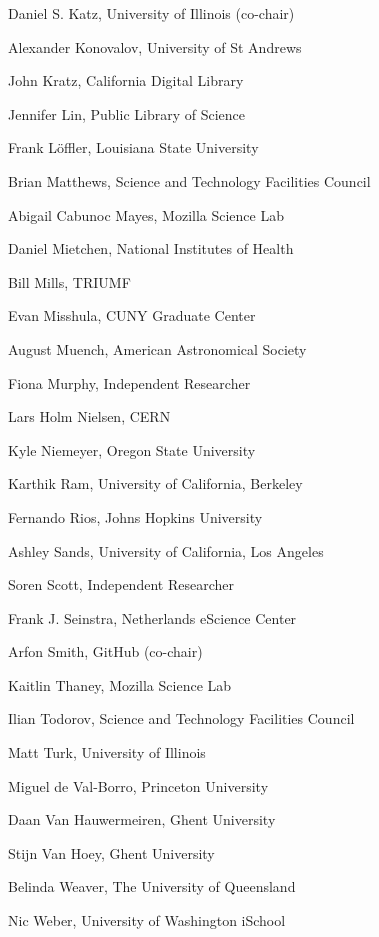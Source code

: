 \documentclass[11pt, oneside]{amsart}
\begin{document}
Daniel S. Katz, University of Illinois (co-chair)

Alexander Konovalov, University of St Andrews

John Kratz, California Digital Library	

Jennifer Lin, Public Library of Science	

Frank L\"offler, Louisiana State University	

Brian Matthews, Science and Technology Facilities Council	

Abigail Cabunoc Mayes, Mozilla Science Lab	

Daniel Mietchen, National Institutes of Health	

Bill Mills, TRIUMF

Evan Misshula, CUNY Graduate Center	

August Muench, American Astronomical Society	

Fiona Murphy, Independent Researcher	

Lars Holm Nielsen, CERN	

Kyle Niemeyer, Oregon State University	

Karthik Ram, University of California, Berkeley	

Fernando Rios, Johns Hopkins University	

Ashley Sands, University of California, Los Angeles	

Soren Scott, Independent Researcher

Frank J. Seinstra, Netherlands eScience Center

Arfon Smith, GitHub (co-chair)

Kaitlin Thaney, Mozilla Science Lab

Ilian Todorov, Science and Technology Facilities Council

Matt Turk, University of Illinois

Miguel de Val-Borro, Princeton University

Daan Van Hauwermeiren, Ghent University

Stijn Van Hoey, Ghent University

Belinda Weaver, The University of Queensland

Nic Weber, University of Washington iSchool



\end{document}
